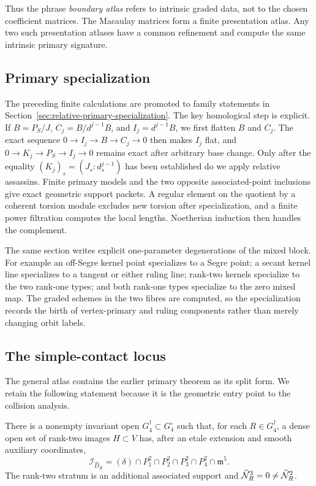 Thus the phrase \emph{boundary atlas} refers to intrinsic graded
data, not to the chosen coefficient matrices.  The Macaulay matrices
form a finite presentation atlas.  Any two such presentation atlases
have a common refinement and compute the same intrinsic primary
signature.

\subsection{Primary specialization}

The preceding finite calculations are promoted to family statements
in Section~\ref{sec:relative-primary-specialization}.  The key
homological step is explicit.  If \(B=P_S/J\),
\(C_j=B/d^{j-1}B\), and \(I_j=d^{j-1}B\), we first flatten
\(B\) and \(C_j\).  The exact sequence
\(0\to I_j\to B\to C_j\to0\) then makes \(I_j\) flat, and
\(0\to K_j\to P_S\to I_j\to0\) remains exact after arbitrary
base change.  Only after the equality
\((K_j)_s=(J_s:d_s^{j-1})\) has been established do we apply
relative assassins.  Finite primary models and the two opposite associated-point inclusions
give exact geometric support packets.  A regular element on the quotient
by a coherent torsion module excludes new torsion after specialization,
and a finite power filtration computes the local lengths.  Noetherian
induction then handles the complement.

The same section writes explicit one-parameter degenerations of the
mixed block.  For example an off-Segre kernel point specializes to a
Segre point; a secant kernel line specializes to a tangent or either
ruling line; rank-two kernels specialize to the two rank-one types;
and both rank-one types specialize to the zero mixed map.  The
graded schemes in the two fibres are computed, so the specialization
records the birth of vertex-primary and ruling components rather than
merely changing orbit labels.

\subsection{The simple-contact locus}

The general atlas contains the earlier primary theorem as its split
form.  We retain the following statement because it is the geometric
entry point to the collision analysis.

\begin{theorem}
\label{thm:main-coranktwo}
There is a nonempty invariant open
\(G_4^\dagger\subset G_4^\circ\) such that, for each
\(R\in G_4^\dagger\), a dense open set of rank-two images
\(H\subset V\) has, after an etale extension and smooth auxiliary
coordinates,
\begin{equation}\label{eq:main-coranktwo}
 \mathcal I_{\widehat D_R}
 =
 (\delta)\cap P_1^2\cap P_2^2\cap P_3^2\cap P_4^2
 \cap\mathfrak m^5.
\end{equation}
The rank-two stratum is an additional associated support and
\(\widehat{\mathcal N}_R^3=0\ne\widehat{\mathcal N}_R^2\).
\end{theorem}


